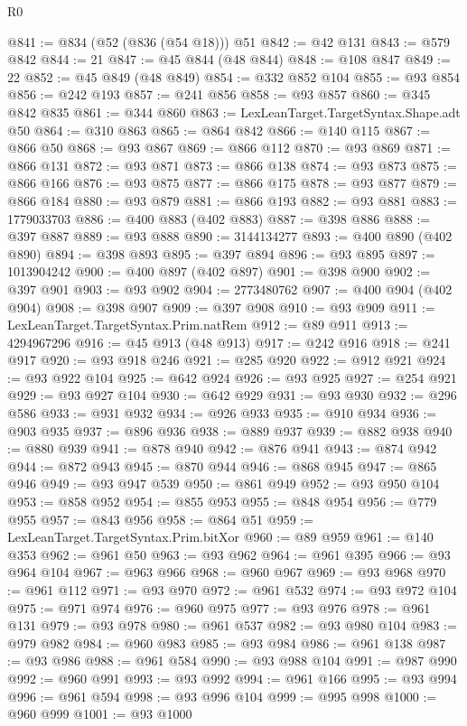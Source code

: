 \begin{lexlean}{R0}
\begin{coremodule}
@841 := @834 (@52 (@836 (@54 @18))) @51
@842 := @42 @131
@843 := @579 @842
@844 := 21
@847 := @45 @844 (@48 @844)
@848 := @108 @847
@849 := 22
@852 := @45 @849 (@48 @849)
@854 := @332 @852 @104
@855 := @93 @854
@856 := @242 @193
@857 := @241 @856
@858 := @93 @857
@860 := @345 @842 @835
@861 := @344 @860
@863 := LexLeanTarget.TargetSyntax.Shape.adt @50
@864 := @310 @863
@865 := @864 @842
@866 := @140 @115
@867 := @866 @50
@868 := @93 @867
@869 := @866 @112
@870 := @93 @869
@871 := @866 @131
@872 := @93 @871
@873 := @866 @138
@874 := @93 @873
@875 := @866 @166
@876 := @93 @875
@877 := @866 @175
@878 := @93 @877
@879 := @866 @184
@880 := @93 @879
@881 := @866 @193
@882 := @93 @881
@883 := 1779033703
@886 := @400 @883 (@402 @883)
@887 := @398 @886
@888 := @397 @887
@889 := @93 @888
@890 := 3144134277
@893 := @400 @890 (@402 @890)
@894 := @398 @893
@895 := @397 @894
@896 := @93 @895
@897 := 1013904242
@900 := @400 @897 (@402 @897)
@901 := @398 @900
@902 := @397 @901
@903 := @93 @902
@904 := 2773480762
@907 := @400 @904 (@402 @904)
@908 := @398 @907
@909 := @397 @908
@910 := @93 @909
@911 := LexLeanTarget.TargetSyntax.Prim.natRem
@912 := @89 @911
@913 := 4294967296
@916 := @45 @913 (@48 @913)
@917 := @242 @916
@918 := @241 @917
@920 := @93 @918 @246
@921 := @285 @920
@922 := @912 @921
@924 := @93 @922 @104
@925 := @642 @924
@926 := @93 @925
@927 := @254 @921
@929 := @93 @927 @104
@930 := @642 @929
@931 := @93 @930
@932 := @296 @586
@933 := @931 @932
@934 := @926 @933
@935 := @910 @934
@936 := @903 @935
@937 := @896 @936
@938 := @889 @937
@939 := @882 @938
@940 := @880 @939
@941 := @878 @940
@942 := @876 @941
@943 := @874 @942
@944 := @872 @943
@945 := @870 @944
@946 := @868 @945
@947 := @865 @946
@949 := @93 @947 @539
@950 := @861 @949
@952 := @93 @950 @104
@953 := @858 @952
@954 := @855 @953
@955 := @848 @954
@956 := @779 @955
@957 := @843 @956
@958 := @864 @51
@959 := LexLeanTarget.TargetSyntax.Prim.bitXor
@960 := @89 @959
@961 := @140 @353
@962 := @961 @50
@963 := @93 @962
@964 := @961 @395
@966 := @93 @964 @104
@967 := @963 @966
@968 := @960 @967
@969 := @93 @968
@970 := @961 @112
@971 := @93 @970
@972 := @961 @532
@974 := @93 @972 @104
@975 := @971 @974
@976 := @960 @975
@977 := @93 @976
@978 := @961 @131
@979 := @93 @978
@980 := @961 @537
@982 := @93 @980 @104
@983 := @979 @982
@984 := @960 @983
@985 := @93 @984
@986 := @961 @138
@987 := @93 @986
@988 := @961 @584
@990 := @93 @988 @104
@991 := @987 @990
@992 := @960 @991
@993 := @93 @992
@994 := @961 @166
@995 := @93 @994
@996 := @961 @594
@998 := @93 @996 @104
@999 := @995 @998
@1000 := @960 @999
@1001 := @93 @1000

\end{coremodule}
\end{lexlean}
